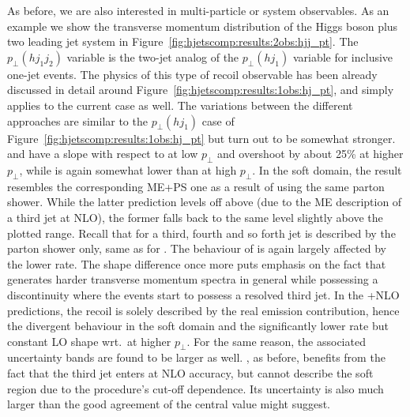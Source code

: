 As before, we are also interested in multi-particle or system
observables. As an example we show the transverse momentum
distribution of the Higgs boson plus two leading jet system in
Figure~\ref{fig:hjetscomp:results:2obs:hjj_pt}. The $p_\perp(hj_1j_2)$
variable is the two-jet analog of the $p_\perp(hj_1)$ variable for
inclusive one-jet events. The physics of this type of recoil
observable has been already discussed in detail around
Figure~\ref{fig:hjetscomp:results:1obs:hj_pt}, and simply applies to
the current case as well. The variations between the different
approaches are similar to the $p_\perp(hj_1)$ case of
Figure~\ref{fig:hjetscomp:results:1obs:hj_pt} but turn out
to be somewhat stronger. \MGaMC and \Sherpa have a slope with respect
to \Powheg at low $p_\perp$ and overshoot by about 25\% at higher
$p_\perp$, while \Herwig is again somewhat lower than \Powheg at high
$p_\perp$. In the soft domain, the \Sherpa \NNLOPS result resembles
the corresponding ME+PS one as a result of using the same parton
shower. While the latter prediction levels off above \Powheg (due to
the ME description of a third jet at NLO), the former falls back to
the same level slightly above the plotted range. Recall that for 
\Sherpa \NNLOPS a third, fourth and so
forth jet is described by the parton shower only, same as for \Powheg.
The behaviour of \Hej is again largely affected by the lower rate. The
shape difference once more puts emphasis on the fact that \Hej
generates harder transverse momentum spectra in general while possessing 
a discontinuity where the events start to possess a resolved third jet. 
In the \GoSam{}+\Sherpa NLO predictions, the recoil is solely
described by the real emission contribution, hence the divergent
behaviour in the soft domain and the significantly lower rate but
constant LO shape wrt.~\Powheg at higher $p_\perp$. For the same
reason, the associated uncertainty bands are found to be larger as
well. \Loopsim, as before, benefits from the fact that the third
jet enters at NLO accuracy, but cannot describe the soft region due to
the procedure's cut-off dependence. Its uncertainty is also much larger 
than the good agreement of the central value might suggest.


